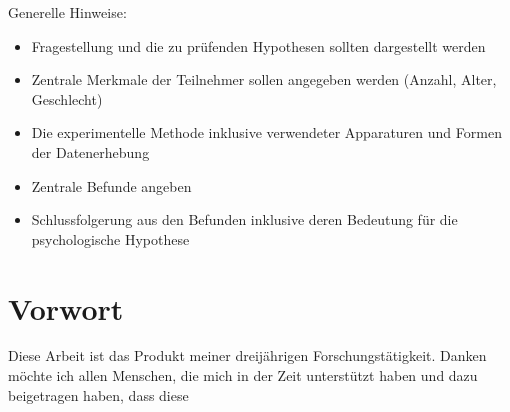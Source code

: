 \documentclass[11pt, twoside, a4paper]{book}		%
\begin{document}
\noindent Generelle Hinweise:
\begin{itemize}
	\item Fragestellung und die zu prüfenden Hypothesen sollten dargestellt werden
	\item Zentrale Merkmale der Teilnehmer sollen angegeben werden (Anzahl, Alter, Geschlecht)
	\item Die experimentelle Methode inklusive verwendeter Apparaturen und Formen der Datenerhebung
	\item Zentrale Befunde angeben
	\item Schlussfolgerung aus den Befunden inklusive deren Bedeutung für die psychologische Hypothese
\end{itemize}
\pagebreak

\renewcommand{\contentsname}{Inhalte}			%
\setcounter{tocdepth}{3}						%
\tableofcontents								%

\renewcommand\listfigurename{Abbildungen}		%
\listoffigures									%



\renewcommand\listtablename{Tabellen}			%
\listoftables 									%



\chapter*{Vorwort \label{cha:Vorwort}}
Diese Arbeit ist das Produkt meiner dreijährigen Forschungstätigkeit. Danken möchte ich 
allen Menschen, die mich in der Zeit unterstützt haben und dazu beigetragen haben, dass diese
\citep{Upper1974} 
\citep{Pahud2016}
\end{document}

